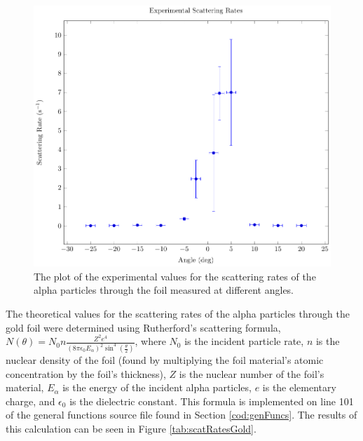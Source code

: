 \documentclass[a4paper]{article}
\begin{document}
\begin{figure}[H]
  \begin{center}
    \includegraphics[scale=0.8]{Plots/ExperimentalScatteringRates/expScatRates.pdf}
  \end{center}
  \caption{The plot of the experimental values for the scattering rates of the
    alpha particles through the foil measured at different angles.}
  \label{gph:expScatRatesGold}
\end{figure}

\qq

\qq The theoretical values for the scattering rates of the alpha particles
through the gold foil were determined using Rutherford's scattering formula, \(
N (\theta) = N_0 n \frac{Z^2 e^4}{(8 \pi \epsilon_0 E_{\alpha})^2 \sin^4
  \left( \frac{\theta}{2} \right)} \), where \( N_0 \) is the incident particle
rate, \( n \) is the nuclear density of the foil (found by multiplying the
foil material's atomic concentration by the foil's thickness), \( Z \) is the
nuclear number of the foil's material, \( E_{\alpha} \) is the energy of the
incident alpha particles, \( e \) is the elementary charge, and \( \epsilon_0 \)
is the dielectric constant. This formula is implemented on line 101 of the
general functions source file found in Section \ref{cod:genFuncs}. The results
of this calculation can be seen in Figure \ref{tab:scatRatesGold}.
\end{document}
